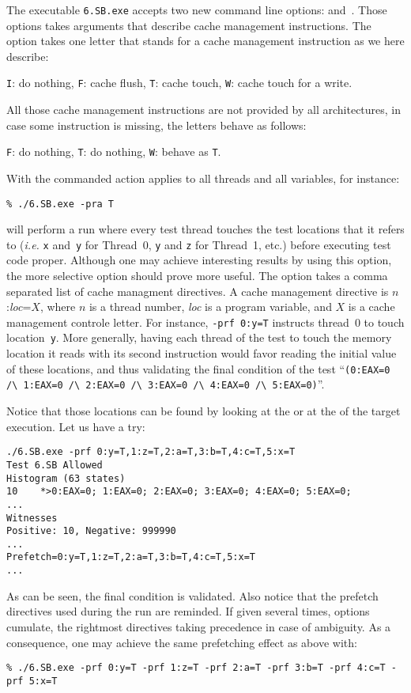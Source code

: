 The executable \texttt{6.SB.exe} accepts two new command line options:
 and~. Those options takes arguments that describe
cache management instructions.
The option  takes one letter that stands for a cache
management instruction as we here describe:
\begin{center}
\texttt{I}: do nothing,
\texttt{F}: cache flush,
\texttt{T}: cache touch,
\texttt{W}: cache touch for a write.
\end{center}
All those cache management instructions are not provided by all architectures,
in case some instruction is missing, the letters behave as follows:
\begin{center}
\texttt{F}: do nothing,
\texttt{T}: do nothing,
\texttt{W}: behave as \texttt{T}.
\end{center}

With  the commanded action applies to all
threads and all variables, for instance:
\begin{verbatim}
% ./6.SB.exe -pra T
\end{verbatim}
will perform a run where every test thread touches the test locations
that it refers to
(\emph{i.e.} \texttt{x} and~\texttt{y} for Thread~0, \texttt{y}
and \texttt{z} for Thread~1, etc.)
before executing test code proper.
Although one may achieve interesting results by using
this  option, the more selective
 option should prove more useful.
The  option takes a comma separated list of cache managment
directives.
A cache management directive is $n$:\textit{loc}=$X$,
where $n$ is a thread number, \textit{loc} is a program variable,
and $X$ is a cache management controle letter.
For instance, \texttt{-prf 0:y=T} instructs
thread~0 to touch location~\texttt{y}.
More generally, having each thread of the test
 to touch the memory location
it reads with its second instruction would favor reading the initial value
of these locations,
and thus validating
the final condition of the test
``\verb+(0:EAX=0 /\ 1:EAX=0 /\ 2:EAX=0 /\ 3:EAX=0 /\ 4:EAX=0 /\ 5:EAX=0)+''.

Notice that those locations can be found by looking
at the 
or at the  of the target execution.
Let us have a try:
\begin{verbatim}
./6.SB.exe -prf 0:y=T,1:z=T,2:a=T,3:b=T,4:c=T,5:x=T
Test 6.SB Allowed
Histogram (63 states)
10    *>0:EAX=0; 1:EAX=0; 2:EAX=0; 3:EAX=0; 4:EAX=0; 5:EAX=0;
...
Witnesses
Positive: 10, Negative: 999990
...
Prefetch=0:y=T,1:z=T,2:a=T,3:b=T,4:c=T,5:x=T
...
\end{verbatim}
As can be seen, the final condition is validated. Also notice
that the prefetch directives used during the run are reminded.
If given several times,  options cumulate,
the rightmost directives taking precedence in case of ambiguity.
As a consequence, one may achieve the same prefetching
effect as above with:
\begin{verbatim}
% ./6.SB.exe -prf 0:y=T -prf 1:z=T -prf 2:a=T -prf 3:b=T -prf 4:c=T -prf 5:x=T
\end{verbatim}


